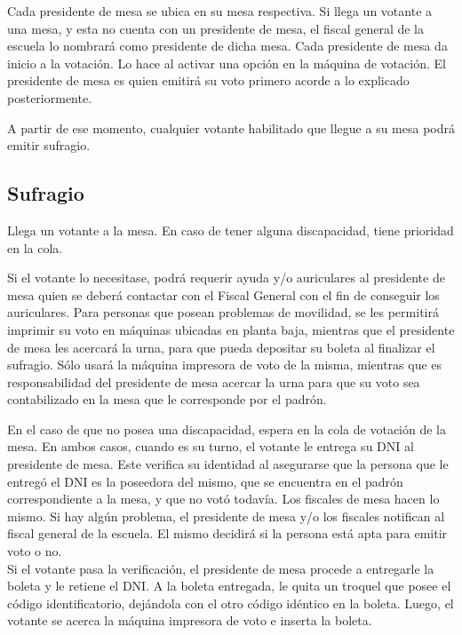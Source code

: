 Cada presidente de mesa se ubica en su mesa respectiva. Si llega un votante a una mesa, y esta no cuenta con un presidente de mesa, el fiscal general de la escuela lo nombrará como presidente de dicha mesa. Cada presidente de mesa da inicio a la votación. Lo hace al activar una opción en la máquina de votación. El presidente de mesa es quien emitirá su voto primero acorde a lo explicado posteriormente.

A partir de ese momento, cualquier votante habilitado que llegue a su mesa podrá emitir sufragio.\\


\subsection{Sufragio}


Llega un votante a la mesa. En caso de tener alguna discapacidad, tiene prioridad en la cola. 

Si el votante lo necesitase, podrá requerir ayuda y/o auriculares al presidente de mesa quien se deberá contactar con el Fiscal General con el fin de conseguir los auriculares. Para personas que posean problemas de movilidad, se les permitirá imprimir su voto en máquinas ubicadas en planta baja, mientras que el presidente de mesa les acercará la urna, para que pueda depositar su boleta al finalizar el sufragio. Sólo usará la máquina impresora de voto de la misma, mientras que es responsabilidad del presidente de mesa acercar la urna para que su voto sea contabilizado en la mesa que le corresponde por el padrón.

En el caso de que no posea una discapacidad, espera en la cola de votación de la mesa. 
En ambos casos, cuando es su turno, el votante le entrega su DNI al presidente de mesa. Este verifica su identidad al asegurarse que la persona que le entregó el DNI es la poseedora del mismo, que se encuentra en el padrón correspondiente a la mesa, y que no votó todavía. Los fiscales de mesa hacen lo mismo. Si hay algún problema, el presidente de mesa y/o los fiscales notifican al fiscal general de la escuela. El mismo decidirá si la persona está apta para emitir voto o no.\\

Si el votante pasa la verificación, el presidente de mesa procede a entregarle la boleta y le retiene el DNI. A la boleta entregada, le quita un troquel que posee el código identificatorio, dejándola con el otro código idéntico en la boleta.
Luego, el votante se acerca la máquina impresora de voto e inserta la boleta.\\

